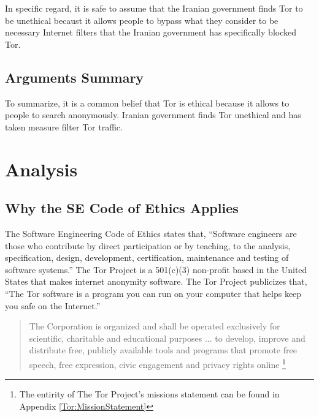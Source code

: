 \documentclass[11pt]{article}
\begin{document}
\begin{multicols}{2}
In specific regard, it is safe to assume that the Iranian government finds Tor
to be unethical becaust it allows people to bypass what they consider to be
necessary Internet filters that the Iranian government has specifically blocked
Tor\cite{IranBlocksTorSameDayFix}.


\subsection{Arguments Summary}

To summarize, it is a common belief that Tor is ethical because it allows to
people to search anonymously. Iranian government finds Tor unethical and has
taken measure filter Tor traffic.




\section{Analysis}

\subsection{Why the SE Code of Ethics Applies} 

The Software Engineering Code of Ethics states that, ``Software engineers are
those who contribute by direct participation or by teaching, to the analysis,
specification, design, development, certification, maintenance and testing of
software systems.'' \cite{SE:CodeOfEthics} The Tor Project is a 501(c)(3)
non-profit based in the United States that makes internet anonymity
software.\cite{Tor:FAQ, Tor:CorePeople} The Tor Project publicizes that, ``The
Tor software is a program you can run on your computer that helps keep you safe
on the Internet.''\cite{Tor:FAQ} 

\begin{quotation}
  The Corporation is organized and shall be operated exclusively for scientific,
  charitable and educational purposes ... to develop, improve and distribute
  free, publicly available tools and programs that promote free speech, free
expression, civic engagement and privacy rights online \footnote{ The entirity
of The Tor Project's missions statement can be found in Appendix
\ref{Tor:MissionStatement}} \cite{TOR:Sponsorship} \end{quotation}
  

\end{multicols}
\end{document}
